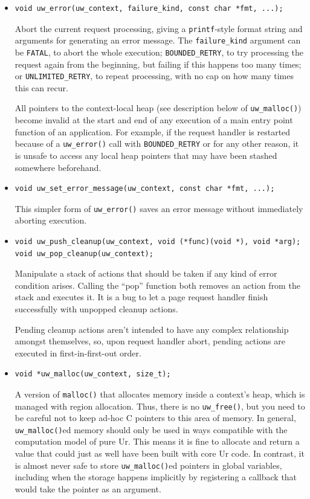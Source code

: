\documentclass{article}
\begin{document}
\begin{itemize}
  \item \begin{verbatim}
void uw_error(uw_context, failure_kind, const char *fmt, ...);
  \end{verbatim}
  Abort the current request processing, giving a \texttt{printf}-style format string and arguments for generating an error message.  The \texttt{failure\_kind} argument can be \texttt{FATAL}, to abort the whole execution; \texttt{BOUNDED\_RETRY}, to try processing the request again from the beginning, but failing if this happens too many times; or \texttt{UNLIMITED\_RETRY}, to repeat processing, with no cap on how many times this can recur.

  All pointers to the context-local heap (see description below of \texttt{uw\_malloc()}) become invalid at the start and end of any execution of a main entry point function of an application.  For example, if the request handler is restarted because of a \texttt{uw\_error()} call with \texttt{BOUNDED\_RETRY} or for any other reason, it is unsafe to access any local heap pointers that may have been stashed somewhere beforehand.

  \item \begin{verbatim}
void uw_set_error_message(uw_context, const char *fmt, ...);
  \end{verbatim}
  This simpler form of \texttt{uw\_error()} saves an error message without immediately aborting execution.

  \item \begin{verbatim}
void uw_push_cleanup(uw_context, void (*func)(void *), void *arg);
void uw_pop_cleanup(uw_context);
  \end{verbatim}
  Manipulate a stack of actions that should be taken if any kind of error condition arises.  Calling the ``pop'' function both removes an action from the stack and executes it.  It is a bug to let a page request handler finish successfully with unpopped cleanup actions.

  Pending cleanup actions aren't intended to have any complex relationship amongst themselves, so, upon request handler abort, pending actions are executed in first-in-first-out order.

  \item \begin{verbatim}
void *uw_malloc(uw_context, size_t);
  \end{verbatim}
  A version of \texttt{malloc()} that allocates memory inside a context's heap, which is managed with region allocation.  Thus, there is no \texttt{uw\_free()}, but you need to be careful not to keep ad-hoc C pointers to this area of memory.  In general, \texttt{uw\_malloc()}ed memory should only be used in ways compatible with the computation model of pure Ur.  This means it is fine to allocate and return a value that could just as well have been built with core Ur code.  In contrast, it is almost never safe to store \texttt{uw\_malloc()}ed pointers in global variables, including when the storage happens implicitly by registering a callback that would take the pointer as an argument.


\end{itemize}
\end{document}
